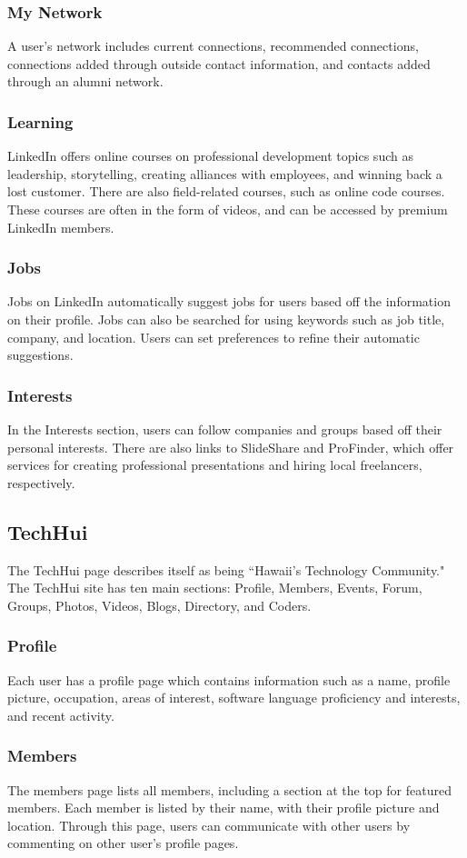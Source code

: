 \subsubsection{My Network}
A user's network includes current connections, recommended connections, connections added through outside contact information, and contacts added through an alumni network. 
\subsubsection{Learning}
LinkedIn offers online courses on professional development topics such as leadership, storytelling, creating alliances with employees, and winning back a lost customer. There are also field-related courses, such as online code courses. These courses are often in the form of videos, and can be accessed by premium LinkedIn members. 
\subsubsection{Jobs}
Jobs on LinkedIn automatically suggest jobs for users based off the information on their profile. Jobs can also be searched for using keywords such as job title, company, and location. Users can set preferences to refine their automatic suggestions.
\subsubsection{Interests}
In the Interests section, users can follow companies and groups based off their personal interests. There are also links to SlideShare and ProFinder, which offer services for creating professional presentations and hiring local freelancers, respectively.

\subsection{TechHui}
The TechHui page describes itself as being ``Hawaii's Technology Community." The TechHui site has ten main sections: Profile, Members, Events, Forum, Groups, Photos, Videos, Blogs, Directory, and Coders.
\subsubsection{Profile}
Each user has a profile page which contains information such as a name, profile picture, occupation, areas of interest, software language proficiency and interests, and recent activity.
\subsubsection{Members}
The members page lists all members, including a section at the top for featured members. Each member is listed by their name, with their profile picture and location. Through this page, users can communicate with other users by commenting on other user's profile pages.
